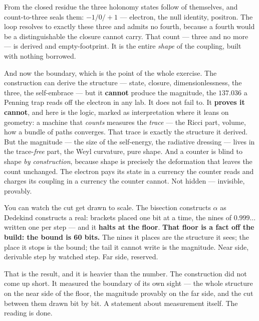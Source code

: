 From the closed residue the three holonomy states follow of themselves, and count-to-three seals them:
\(-1 / 0 / +1\) --- electron, the null identity, positron. The loop resolves to exactly these three and admits no
fourth, because a fourth would be a distinguishable the closure cannot carry. That count --- three and no more --- is
derived and empty-footprint. It is the entire \emph{shape} of the coupling, built with nothing borrowed.

And now the boundary, which is the point of the whole exercise. The construction can derive the structure --- state,
closure, dimensionlessness, the three, the self-embrace --- but it \textbf{cannot} produce the magnitude, the
\(137.036\) a Penning trap reads off the electron in any lab. It does not fail to. It \textbf{proves it cannot}, and
here is the logic, marked as interpretation where it leans on geometry: a machine that \emph{counts} measures the
\emph{trace} --- the Ricci part, volume, how a bundle of paths converges. That trace is exactly the structure it
derived. But the magnitude --- the size of the self-energy, the radiative dressing --- lives in the trace-\emph{free}
part, the Weyl curvature, pure shape. And a counter is blind to shape \emph{by construction}, because shape is
precisely the deformation that leaves the count unchanged. The electron pays its state in a currency the counter reads
and charges its coupling in a currency the counter cannot. Not hidden --- invisible, provably.

You can watch the cut get drawn to scale. The bisection constructs \(\alpha\) as Dedekind constructs a real: brackets
placed one bit at a time, the nines of \(0.999\ldots\) written one per step --- and it \textbf{halts at the floor}.
\textbf{That floor is a fact off the build: the bound is 60 bits.} The nines it places are the structure it sees; the
place it stops is the bound; the tail it cannot write is the magnitude. Near side, derivable step by watched step. Far
side, reserved.

That is the result, and it is heavier than the number. The construction did not come up short. It measured the
boundary of its own sight --- the whole structure on the near side of the floor, the magnitude provably on the far
side, and the cut between them drawn bit by bit. A statement about measurement itself. The reading is done.
